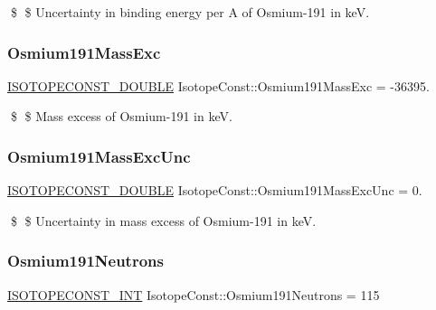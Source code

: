 \$ \$ Uncertainty in binding energy per A of Osmium-\/191 in keV. \mbox{\label{group___isotope_const-_osmium-_os191_gac6082ff66ce1ecaf09d5f52c799f5857}} 
\subsubsection{\texorpdfstring{Osmium191\+Mass\+Exc}{Osmium191MassExc}}
{\footnotesize\ttfamily \mbox{\hyperlink{group___isotope_const-_macros_ga8f45a7272ce02c0b4c65c44636ed719a}{I\+S\+O\+T\+O\+P\+E\+C\+O\+N\+S\+T\+\_\+\+D\+O\+U\+B\+LE}} Isotope\+Const\+::\+Osmium191\+Mass\+Exc = -\/36395.}

\$ \$ Mass excess of Osmium-\/191 in keV. \mbox{\label{group___isotope_const-_osmium-_os191_ga39577cb129583a40712588be4d18f841}} 
\subsubsection{\texorpdfstring{Osmium191\+Mass\+Exc\+Unc}{Osmium191MassExcUnc}}
{\footnotesize\ttfamily \mbox{\hyperlink{group___isotope_const-_macros_ga8f45a7272ce02c0b4c65c44636ed719a}{I\+S\+O\+T\+O\+P\+E\+C\+O\+N\+S\+T\+\_\+\+D\+O\+U\+B\+LE}} Isotope\+Const\+::\+Osmium191\+Mass\+Exc\+Unc = 0.}

\$ \$ Uncertainty in mass excess of Osmium-\/191 in keV. \mbox{\label{group___isotope_const-_osmium-_os191_gab047b982ac6688294ae263e260a998d9}} 
\subsubsection{\texorpdfstring{Osmium191\+Neutrons}{Osmium191Neutrons}}
{\footnotesize\ttfamily \mbox{\hyperlink{group___isotope_const-_macros_ga5f18360b3e99483a35c32d789e62621c}{I\+S\+O\+T\+O\+P\+E\+C\+O\+N\+S\+T\+\_\+\+I\+NT}} Isotope\+Const\+::\+Osmium191\+Neutrons = 115}

